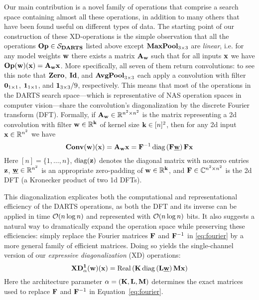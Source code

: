 Our main contribution is a novel family of operations that comprise a search space containing almost all these operations, in addition to many others that have been found useful on different types of data.
The starting point of our construction of these XD-operations is the simple observation that all the operations $\operatorname{\operatorname{\bf Op}}\in\mathcal S_{\mathbf{DARTS}}$ listed above except $\operatorname{\operatorname{\bf MaxPool}}_{3\times3}$ are {\em linear}, i.e.
for any model weights $\mathbf{w}$ there exists a matrix $\mathbf{A}_{\mathbf{w}}$ such that for all inputs $\mathbf{x}$ we have $\operatorname{\operatorname{\bf Op}}(\mathbf{w})(\mathbf{x})=\mathbf{A}_{\mathbf{w}}\mathbf{x}$.
More specifically, all seven of them return convolutions:
to see this note that $\operatorname{\operatorname{\bf Zero}}$, $\operatorname{\operatorname{\bf Id}}$, and $\operatorname{\operatorname{\bf AvgPool}}_{3\times3}$ each apply a convolution with filter $\mathbf 0_{1\times1}$, $\mathbf 1_{1\times1}$, and $\mathbf 1_{3\times3}/9$, respectively.
This means that most of the operations in the DARTS search space---which is representative of NAS operation spaces in computer vision---share the convolution's diagonalization by the discrete Fourier transform (DFT).
Formally, if $\mathbf{A}_{\mathbf{w}}\in\mathbb R^{n^2\times n^2}$ is the matrix representing a 2d convolution with filter $\mathbf{w}\in\mathbb R^{\mathbf{k}}$ of kernel size $\mathbf{k}\in[n]^2$, then for any 2d input $\mathbf{x}\in\mathbb R^{n^2}$ we have
\begin{equation}\label{eq:fourier}
\operatorname{\operatorname{\bf Conv}}(\mathbf{w})(\mathbf{x})=\mathbf{A}_{\mathbf{w}}\mathbf{x}=\mathbf{F}^{-1}\operatorname{\operatorname{diag}}\left(\mathbf{F}\underline{\mathbf{w}}\right)\mathbf{F}\mathbf{x}
\end{equation}
Here $[n]=\{1,\dots,n\}$, $\operatorname{\operatorname{diag}}(\mathbf{z})$ denotes the diagonal matrix with nonzero entries $\mathbf{z}$, $\underline{\mathbf{w}}\in\mathbb R^{n^2}$ is an appropriate zero-padding of $\mathbf{w}\in\mathbb R^{\mathbf{k}}$, and $\mathbf{F}\in\mathbb C^{n^2\times n^2}$ is the 2d DFT (a Kronecker product of two 1d DFTs).

This diagonalization explicates both the computational and representational efficiency of the DARTS operations, as both the DFT and its inverse can be applied in time $\mathcal O(n\log n)$ and represented with $\mathcal O(n\log n)$ bits.
It also suggests a natural way to dramatically expand the operation space while preserving these efficiencies:
simply replace the Fourier matrices $\mathbf{F}$ and $\mathbf{F}^{-1}$ in \eqref{eq:fourier} by a more general family of efficient matrices.
Doing so yields the single-channel version of our {\em expressive diagonalization} (XD) operations:
\begin{equation}\label{eq:xd1}
\mathbf{XD}_\alpha^\mathbf 1(\mathbf{w})(\mathbf{x})=\operatorname{\operatorname{Real}}\left(\mathbf{K}\operatorname{\operatorname{diag}}\left(\mathbf{L}\underline{\mathbf{w}}\right)\mathbf{M}\mathbf{x}\right)
\end{equation}
Here the architecture parameter $\alpha=(\mathbf{K},\mathbf{L},\mathbf{M})$ determines the exact matrices used to replace $\mathbf{F}$ and $\mathbf{F}^{-1}$ in Equation~\ref{eq:fourier}.

